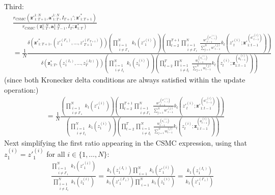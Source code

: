 \documentclass[11pt]{article}
\newcommand{\z}{\mathbf{z}}
\newcommand{\abold}{\mathbf{a}}
\begin{document}
Third:
\begin{align*}
& \frac{r_{\mathrm{CSMC}}({\z'}_{1:T+1}^{1:N}, {\abold'}_{1:T}^{1:N}, I_{T+1}'; {\z'}_{1:T+1}^*)}
{r_{\mathrm{CSMC}}(\z_{1:T}^{1:N}, \abold_{1:T-1}^{1:N}, I_T; \z_{1:T}^*)}\\
&= \frac{1}{N} \frac{
\delta({\z'}_{1:T+1}^*,  ({z'}_1^{(I'_1)}, \ldots, {z'}_{T+1}^{(I'_{T+1})}))
        \left( \prod_{\substack{i=1\\i \ne I'_1}}^N k_1({z'}_1^{(i)}) \right)
        \left( \prod_{t=2}^{T+1} \prod_{\substack{i=1\\i \ne I'_t}}^N \frac{{w'}_{t-1}^{({a'}_{t-1}^{(i)})}}{\sum_{j=1}^N {w'}_{t-1}^{(j)}} k_t({z'}_t^{(i)}; {\z'}_{1:t-1}^{({a'}_{t-1}^{(i)})} )\right)
}
{
\delta(\z_{1:T}^*,  (z_1^{(I_1)}, \ldots, z_T^{(I_T)}))
        \left( \prod_{\substack{i=1\\i \ne I_1}}^N k_1(z_1^{(i)}) \right)
        \left( \prod_{t=2}^T \prod_{\substack{i=1\\i \ne I_t}}^N \frac{w_{t-1}^{(a_{t-1}^{(i)})}}{\sum_{j=1}^N w_{t-1}^{(j)}} k_t(z_t^{(i)}; \z_{1:t-1}^{(a_{t-1}^{(i)})} )\right)
}
\end{align*}
(since both Kronecker delta conditions are always satisfied within the update operation:)
\begin{align*}
&= \frac{1}{N} \frac{
        \left( \prod_{\substack{i=1\\i \ne I'_1}}^N k_1({z'}_1^{(i)}) \right)
        \left( \prod_{t=2}^{T+1} \prod_{\substack{i=1\\i \ne I'_t}}^N \frac{{w'}_{t-1}^{({a'}_{t-1}^{(i)})}}{\sum_{j=1}^N {w'}_{t-1}^{(j)}} k_t({z'}_t^{(i)}; {\z'}_{1:t-1}^{({a'}_{t-1}^{(i)})} )\right)
}{
        \left( \prod_{\substack{i=1\\i \ne I_1}}^N k_1(z_1^{(i)}) \right)
        \left( \prod_{t=2}^T \prod_{\substack{i=1\\i \ne I_t}}^N \frac{w_{t-1}^{(a_{t-1}^{(i)})}}{\sum_{j=1}^N w_{t-1}^{(j)}} k_t(z_t^{(i)}; \z_{1:t-1}^{(a_{t-1}^{(i)})} )\right)
}
\end{align*}
Next simplifying the first ratio appearing in the $\mathrm{CSMC}$ expression, using that $z_1^{(i)} = {z'}_1^{(i)}$ for all $i \in \{1, \ldots, N\}$:
\begin{align*}
\frac{
    \prod_{\substack{i=1\\i \ne I'_1}}^N k_1({z'}_1^{(i)})
}{
    \prod_{\substack{i=1\\i \ne I_1}}^N k_1(z_1^{(i)})
} =
\frac{
    k_1(z_1^{(I_1)}) \prod_{\substack{i=1}}^N k_1({z'}_1^{(i)})
}{
    k_1({z'}_1^{(I'_1)}) \prod_{\substack{i=1}}^N k_1(z_1^{(i)})
} =
\frac{
k_1(z_1^{(I_1)}) 
}{
k_1({z'}_1^{(I'_1)})
}
\end{align*}
\end{document}
